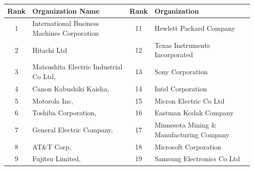 \begin{table}[t]
\centering
\begin{tabular}{clcl}
\hline
\multicolumn{1}{|l|}{\textbf{Rank}} & \multicolumn{1}{l|}{\textbf{Organization Name}}                  & \multicolumn{1}{l|}{\textbf{Rank}} & \multicolumn{1}{l|}{\textbf{Organization}}                     \\ \hline
\multicolumn{1}{|c|}{1}             & \multicolumn{1}{l|}{International Business Machines Corporation} & \multicolumn{1}{c|}{11}            & \multicolumn{1}{l|}{Hewlett Packard Company}                   \\ \hline
\multicolumn{1}{|c|}{2}             & \multicolumn{1}{l|}{Hitachi Ltd}                                 & \multicolumn{1}{c|}{12}            & \multicolumn{1}{l|}{Texas Instruments Incorporated}            \\ \hline
\multicolumn{1}{|c|}{3}             & \multicolumn{1}{l|}{Matsushita Electric Industrial Co Ltd,}      & \multicolumn{1}{c|}{13}            & \multicolumn{1}{l|}{Sony Corporation}                          \\ \hline
\multicolumn{1}{|c|}{4}             & \multicolumn{1}{l|}{Canon Kabushiki Kaisha,}                     & \multicolumn{1}{c|}{14}            & \multicolumn{1}{l|}{Intel Corporation}                         \\ \hline
\multicolumn{1}{|c|}{5}             & \multicolumn{1}{l|}{Motorola Inc,}                               & \multicolumn{1}{c|}{15}            & \multicolumn{1}{l|}{Micron Electric Co Ltd}                    \\ \hline
\multicolumn{1}{|c|}{6}             & \multicolumn{1}{l|}{Toshiba Corporation,}                        & \multicolumn{1}{c|}{16}            & \multicolumn{1}{l|}{Eastman Kodak Company}                     \\ \hline
\multicolumn{1}{|c|}{7}             & \multicolumn{1}{l|}{General Electric Company,}                   & \multicolumn{1}{c|}{17}            & \multicolumn{1}{l|}{Minnesota Mining \& Manufacturing Company} \\ \hline
\multicolumn{1}{|c|}{8}             & \multicolumn{1}{l|}{AT\&T Corp,}                                 & \multicolumn{1}{c|}{18}            & \multicolumn{1}{l|}{Microsoft Corporation}                     \\ \hline
\multicolumn{1}{|c|}{9}             & \multicolumn{1}{l|}{Fujitsu Limited,}                            & \multicolumn{1}{c|}{19}            & \multicolumn{1}{l|}{Samsung Electronics Co Ltd}                \\ \hline

\end{tabular}
\end{table}
